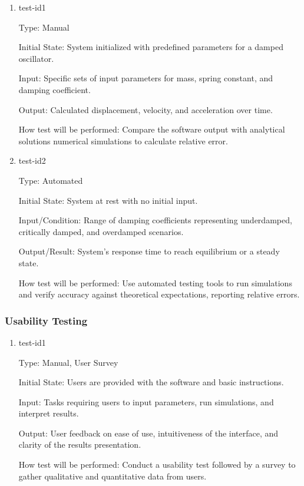 \documentclass[12pt, titlepage]{article}
\begin{document}
\begin{enumerate}

\item{test-id1\\}

Type: Manual
					
Initial State: System initialized with predefined parameters for a damped oscillator.
					
Input: Specific sets of input parameters for mass, spring constant, and damping 
coefficient.
					
Output: Calculated displacement, velocity, and acceleration over time.
					
How test will be performed: Compare the software output with analytical solutions 
numerical simulations to calculate relative error.

\item{test-id2\\}

Type: Automated
					
Initial State: System at rest with no initial input.
					
Input/Condition: Range of damping coefficients representing underdamped, critically 
damped, and overdamped scenarios.
					
Output/Result: System's response time to reach equilibrium or a steady state.
					
How test will be performed: Use automated testing tools to run simulations and verify 
accuracy against theoretical expectations, reporting relative errors.

\end{enumerate}

\subsubsection{Usability Testing}

\begin{enumerate}

\item{test-id1\\}
  
Type: Manual, User Survey
          
Initial State: Users are provided with the software and basic instructions.
          
Input: Tasks requiring users to input parameters, run simulations, and interpret results.
          
Output: User feedback on ease of use, intuitiveness of the interface, and clarity of the 
results presentation.
          
How test will be performed: Conduct a usability test followed by a survey to gather 
qualitative and quantitative data from users.
  
\end{enumerate}
\end{document}

